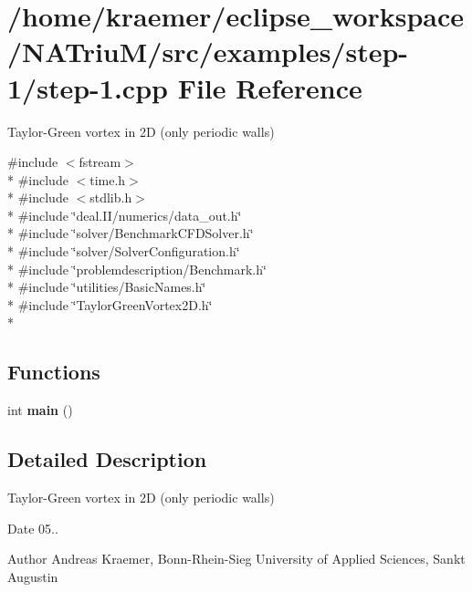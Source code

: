 \hypertarget{step-1_8cpp}{\section{/home/kraemer/eclipse\-\_\-workspace/\-N\-A\-Triu\-M/src/examples/step-\/1/step-\/1.cpp File Reference}
\label{step-1_8cpp}
}


Taylor-\/\-Green vortex in 2\-D (only periodic walls)  


{\ttfamily \#include $<$fstream$>$}\\*
{\ttfamily \#include $<$time.\-h$>$}\\*
{\ttfamily \#include $<$stdlib.\-h$>$}\\*
{\ttfamily \#include \char`\"{}deal.\-I\-I/numerics/data\-\_\-out.\-h\char`\"{}}\\*
{\ttfamily \#include \char`\"{}solver/\-Benchmark\-C\-F\-D\-Solver.\-h\char`\"{}}\\*
{\ttfamily \#include \char`\"{}solver/\-Solver\-Configuration.\-h\char`\"{}}\\*
{\ttfamily \#include \char`\"{}problemdescription/\-Benchmark.\-h\char`\"{}}\\*
{\ttfamily \#include \char`\"{}utilities/\-Basic\-Names.\-h\char`\"{}}\\*
{\ttfamily \#include \char`\"{}Taylor\-Green\-Vortex2\-D.\-h\char`\"{}}\\*
\subsection*{Functions}
\begin{DoxyCompactItemize}
\item 
\hypertarget{step-1_8cpp_ae66f6b31b5ad750f1fe042a706a4e3d4}{int {\bfseries main} ()}\label{step-1_8cpp_ae66f6b31b5ad750f1fe042a706a4e3d4}

\end{DoxyCompactItemize}


\subsection{Detailed Description}
Taylor-\/\-Green vortex in 2\-D (only periodic walls) \begin{DoxyDate}{Date}
05.. 
\end{DoxyDate}
\begin{DoxyAuthor}{Author}
Andreas Kraemer, Bonn-\/\-Rhein-\/\-Sieg University of Applied Sciences, Sankt Augustin 
\end{DoxyAuthor}

